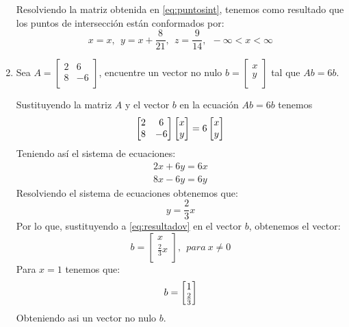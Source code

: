 \documentclass[12pt,titlepage]{article}
\begin{document}
\begin{enumerate}
\begin{gather}
\end{gather}\\
Resolviendo la matriz obtenida en \eqref{eq:puntosint}, tenemos como resultado que los puntos de intersección están conformados por:
\begin{equation}
    x=x,\ \ y=x+\frac{8}{21},\ \ z=\frac{9}{14},\ \ -\infty<x<\infty\nonumber
\end{equation}

\clearpage
\item 	Sea $A=\begin{bmatrix}2&6\\8&-6\\\end{bmatrix}$, encuentre un vector no nulo $b=\begin{bmatrix}x\\y\\\end{bmatrix}$ tal que $Ab=6b$.
\par \parskip 8mm
Sustituyendo la matriz $A$ y el vector $b$ en la ecuación $Ab=6b$ tenemos
\begin{equation} \setcounter{equation}{1}
    \left[\begin{matrix}2&6\\8&-6\\\end{matrix}\right]\left[\begin{matrix}x\\y\\\end{matrix}\right]=6\left[\begin{matrix}x\\y\\\end{matrix}\right]\nonumber
\end{equation}
Teniendo así el sistema de ecuaciones:
\begin{gather}
    2x+6y=6x\nonumber\\
    8x-6y=6y\nonumber 
\end{gather}
Resolviendo el sistema de ecuaciones obtenemos que:
\begin{equation} 
    y=\frac{2}{3}x\label{eq:resultadov}
\end{equation}
Por lo que, sustituyendo a \eqref{eq:resultadov} en el vector $b$, obtenemos el vector:
\begin{equation}
    b=\left[\begin{matrix}x\\\frac{2}{3}x\\\end{matrix}\right],\ \ para\ x\not=0 \nonumber
\end{equation}
Para $x=1$ tenemos que:
\begin{equation} \setcounter{equation}{1}
    b=\left[\begin{matrix}1\\\frac{2}{3}\\\end{matrix}\right]\nonumber
\end{equation}
Obteniendo asi un vector no nulo $b$.



\end{enumerate}
\end{document}
